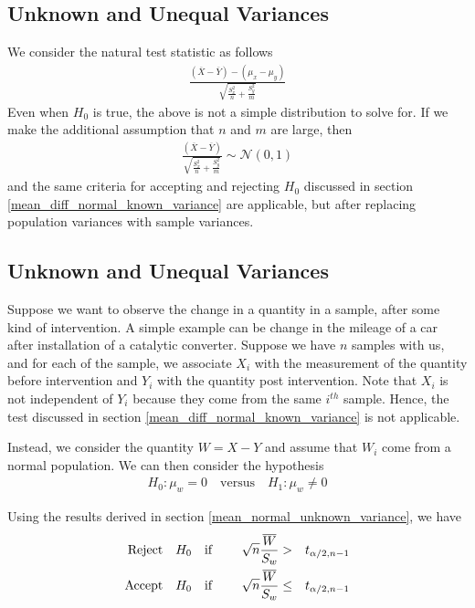 \documentclass[../probability-notes.tex]{subfiles}
\begin{document}
    \subsection{Unknown and Unequal Variances}
    We consider the natural test statistic as follows
    \begin{align*}
        \frac{(\overline{X} - \overline{Y}) - (\mu_{x} - \mu_{y})}{\sqrt{\frac{S_{x}^{2}}{n} + \frac{S_{y}^{2}}{m}}}
    \end{align*}
    Even when $H_{0}$ is true, the above is not a simple distribution to solve for. If we make the additional assumption that $n$ and $m$ are large, then
    \begin{align*}
        \frac{(\overline{X} - \overline{Y})}{\sqrt{\frac{S_{x}^{2}}{n} + \frac{S_{y}^{2}}{m}}} \sim \mathcal{N}(0, 1)
    \end{align*}
    and the same criteria for accepting and rejecting $H_{0}$ discussed in section \ref{mean_diff_normal_known_variance} are applicable, but after replacing population variances with sample variances.\newline


    \subsection{Unknown and Unequal Variances}
    Suppose we want to observe the change in a quantity in a sample, after some kind of intervention. A simple example can be change in the mileage of a car after installation of a catalytic converter. Suppose we have $n$ samples with us, and for each of the sample, we associate $X_{i}$ with the measurement of the quantity before intervention and $Y_{i}$ with the quantity post intervention. Note that $X_{i}$ is not independent of $Y_{i}$ because they come from the same $i^{th}$ sample. Hence, the test discussed in section \ref{mean_diff_normal_known_variance} is not applicable.\newline

    Instead, we consider the quantity $W = X - Y$ and assume that $W_{i}$ come from a normal population. We can then consider the hypothesis
    \begin{align*}
        H_{0}: \mu_{w} = 0 \quad \text{versus} \quad H_{1}: \mu_{w} \neq 0
    \end{align*}

    Using the results derived in section \ref{mean_normal_unknown_variance}, we have
    \begin{alignat*}{4}
        \text{Reject\quad} &H_{0} \text{\quad if \quad} &\sqrt{n}\frac{\overline{W}}{S_{w}} &> &t_{\alpha/2, n-1}\\
        \text{Accept\quad} &H_{0} \text{\quad if\quad} &\sqrt{n}\frac{\overline{W}}{S_{w}} &\leq &t_{\alpha/2, n-1}
    \end{alignat*}
\end{document}
